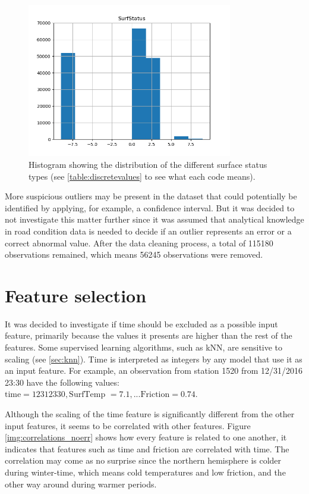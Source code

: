 \begin{figure}[H] 
	\centering
	\includegraphics[width=0.8\textwidth]{media/HistogramSurfaceStatus.png}
	\caption{Histogram showing the distribution of the different surface status types (see \ref{table:discretevalues} to see what each code means).}
	\label{img:histogram_surfstatus}
\end{figure}

	More suspicious outliers may be present in the dataset that could potentially be identified by applying, for example, a confidence interval. But it was decided to not investigate this matter further since it was assumed that analytical knowledge in road condition data is needed to decide if an outlier represents an error or a correct abnormal value. After the data cleaning process, a total of 115180 observations remained, which means 56245 observations were removed.


\section{Feature selection}
	It was decided to investigate if time should be excluded as a possible input feature, primarily because the values it presents are higher than the rest of the features. Some supervised learning algorithms, such as kNN, are sensitive to scaling (see \ref{sec:knn}). Time is interpreted as integers by any model that use it as an input feature. For example, an observation from station 1520 from 12/31/2016 23:30 have the following values: $\text{time} = 12312330, \text{SurfTemp }= 7.1, ... \text{Friction} = 0.74$. 

	Although the scaling of the time feature is significantly different from the other input features, it seems to be correlated with other features. Figure \ref{img:correlations_noerr} shows how every feature is related to one another, it indicates that features such as time and friction are correlated with time. The correlation may come as no surprise since the northern hemisphere is colder during winter-time, which means cold temperatures and low friction, and the other way around during warmer periods. 


